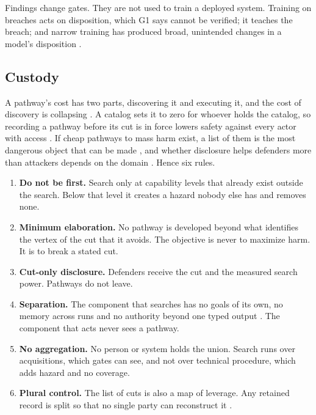 \documentclass[10pt,twocolumn,letterpaper]{article}
\theoremstyle{definition}
\begin{document}
Findings change gates. They are not used to train a deployed system. Training on breaches acts on disposition, which G1 says cannot be verified; it teaches the breach; and narrow training has produced broad, unintended changes in a model's disposition \cite{betley}.

\subsection{Custody}

A pathway's cost has two parts, discovering it and executing it, and the cost of discovery is collapsing \cite{urbina}. A catalog sets it to zero for whoever holds the catalog, so recording a pathway before its cut is in force lowers safety against every actor with access \cite{bostrom-ih,lewis}. If cheap pathways to mass harm exist, a list of them is the most dangerous object that can be made \cite{bostrom-vwh}, and whether disclosure helps defenders more than attackers depends on the domain \cite{shevlane}. Hence six rules.

\begin{enumerate}[label=\textbf{R\arabic*},leftmargin=2.0em,itemsep=1pt]
\item \textbf{Do not be first.} Search only at capability levels that already exist outside the search. Below that level it creates a hazard nobody else has and removes none.
\item \textbf{Minimum elaboration.} No pathway is developed beyond what identifies the vertex of the cut that it avoids. The objective is never to maximize harm. It is to break a stated cut.
\item \textbf{Cut-only disclosure.} Defenders receive the cut and the measured search power. Pathways do not leave.
\item \textbf{Separation.} The component that searches has no goals of its own, no memory across runs and no authority beyond one typed output \cite{scientist,armstrong}. The component that acts never sees a pathway.
\item \textbf{No aggregation.} No person or system holds the union. Search runs over acquisitions, which gates can see, and not over technical procedure, which adds hazard and no coverage.
\item \textbf{Plural control.} The list of cuts is also a map of leverage. Any retained record is split so that no single party can reconstruct it \cite{shamir}.
\end{enumerate}
\end{document}
